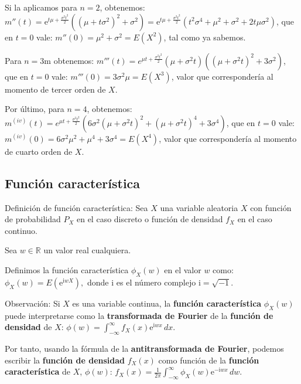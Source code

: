 \documentclass[]{book}
\begin{document}
Si la aplicamos para \(n=2\), obtenemos:
\(m''(t)=\mathrm{e}^{ t \mu +\frac{\sigma^2 t^2}{2}} \left((\mu+t\sigma^2)^2+ \sigma^2 \right) =\mathrm{e}^{ t \mu +\frac{\sigma^2 t^2}{2}} \left(t^2\sigma^4+\mu^2+\sigma^2+ 2t\mu\sigma^2 \right)\), que en \(t=0\) vale:
\(m''(0)=\mu^2+\sigma^2=E\left(X^2\right)\), tal como ya sabemos.

Para \(n=3\)m obtenemos:
\(m'''(t)=e^{\mu t+\frac{\sigma ^2 t^2}{2}}\left(\mu +\sigma ^2 t\right) \left(\left(\mu +\sigma ^2 t\right)^2+3 \sigma ^2\right)\), que en \(t=0\) vale: \(m'''(0)=3\sigma^2\mu = E\left(X^3\right)\), valor que correspondería al momento de tercer orden de \(X\).

Por último, para \(n=4\), obtenemos:
\(m^{(iv)}(t)=e^{\mu t+\frac{\sigma ^2 t^2}{2}}  \left(6 \sigma ^2 \left(\mu  +\sigma ^2 t\right)^2+\left(\mu  +\sigma ^2 t\right)^4+3 \sigma  ^4\right)\), que en \(t=0\) vale: \(m^{(iv)}(0)=6\sigma^2\mu^2+\mu^4+3\sigma^4=E\left(X^4\right)\), valor que correspondería al momento de cuarto orden de \(X\).

\hypertarget{funciuxf3n-caracteruxedstica}{%
\subsection{Función característica}\label{funciuxf3n-caracteruxedstica}}

Definición de función característica:
Sea \(X\) una variable aleatoria \(X\) con función de probabilidad \(P_X\) en el caso discreto o función
de densidad \(f_X\) en el caso continuo.

Sea \(w\in\mathbb{R}\) un valor real cualquiera.

Definimos la función característica \(\phi_X(w)\) en el valor \(w\) como: \(\phi_X(w)=E\left(\mathrm{e}^{\mathrm{i} w X}\right),\) donde \(\mathrm{i}\) es el número complejo \(\mathrm{i}=\sqrt{-1}\).

Observación:
Si \(X\) es una variable continua, la \textbf{función característica} \(\phi_X(w)\) puede interpretarse como la \textbf{transformada de Fourier} de la \textbf{función de densidad} de \(X\):
\(\phi(w)=\int_{-\infty}^\infty f_X(x)\mathrm{e}^{\mathrm{i}w x}\, dx.\)

Por tanto, usando la fórmula de la \textbf{antitransformada de Fourier}, podemos escribir la \textbf{función de densidad} \(f_X(x)\) como función de la \textbf{función característica} de \(X\), \(\phi(w)\):
\(f_X(x)=\frac{1}{2\pi}\int_{-\infty}^\infty \phi_X(w)\mathrm{e}^{-\mathrm{i}w x}\, dw.\)
\end{document}
